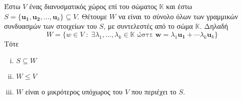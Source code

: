 \begin{thm}
  Έστω $ V $ ένας διανυσματικός χώρος επί του σώματος $ \mathbb{K} $ και έστω 
  $ S = \{ \mathbf{u_{1}}, \mathbf{u_{2}}, \ldots, \mathbf{u}_{k}\} \subseteq V $.
  Θέτουμε $ W $ να είναι το σύνολο όλων των γραμμικών συνδυασμών των στοιχείων του 
  $S$, με συντελεστές από το σώμα $ \mathbb{K} $.  Δηλαδή 
  \[
    W = \{ w \in V \; : \; \exists \lambda _{1}, \ldots, \lambda _{k} \in 
      \mathbb{K} \; \text{ώστε} \; \mathbf{w} = \lambda _{1} 
    \mathbf{u_{1}}+ \cdots \lambda _{k} \mathbf{u}_{k}\} 
  \] 
  Τότε
  \begin{enumerate}[i)]
    \item $ S \subseteq W $
    \item $ W \leq V $ 
    \item $ W $ είναι ο μικρότερος υπόχωρος του $V$ που περιέχει το $S$.
  \end{enumerate}
\end{thm}
